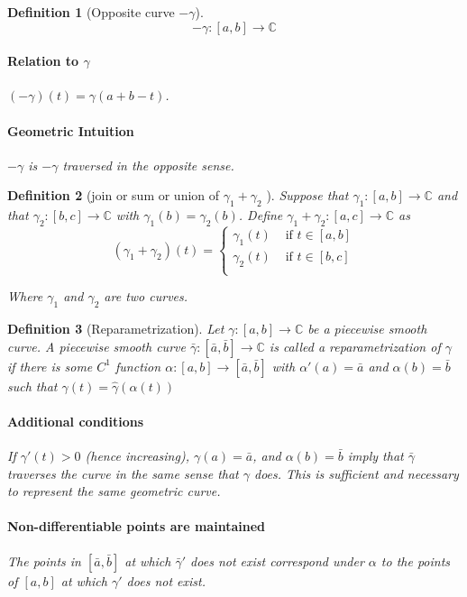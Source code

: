 \documentclass[a4paper]{article}
\newtheorem{definition}{Definition}
\newcommand{\C}{\mathbb{C}}
\begin{document}
\begin{definition}[Opposite curve $-\gamma$]
  \[
    - \gamma : [a , b] \to \C
  \]
  \paragraph{Relation to $\gamma$}
  $(- \gamma)(t) = \gamma(a + b - t)$.

  \paragraph{Geometric Intuition}
  $- \gamma $ is $- \gamma$ traversed in the opposite sense. 
\end{definition}

\begin{definition}[join or sum or union of $\gamma_1 + \gamma_2$ ]
  Suppose that $\gamma_1 : [a, b] \to \C$ and that $\gamma_2: [b, c] \to \C$ with $\gamma_1(b) = \gamma_2(b)$. 
  Define $\gamma_1 + \gamma_2 : [a, c] \to \C$ as 
  \[ (\gamma_1 + \gamma_2)(t) = \begin{cases} 
      \gamma_1(t) & \text{ if } t \in [a, b] \\ 
      \gamma_2(t) & \text{ if } t \in [b, c] \\ 
   \end{cases}
\]

  Where $\gamma_1$ and $\gamma_2$ are two curves. 
\end{definition}





\begin{definition}[Reparametrization]
  Let $\gamma : [a, b] \to \C$ be a piecewise smooth curve.
  A  piecewise smooth curve $\bar{\gamma}: [\bar{a}, \bar{b}] \to \C$ is called a reparametrization of $\gamma$ if there is some $C^1$ function $\alpha: [a, b] \to [\bar{a}, \bar{b}]$ with $\alpha'(a) = \bar{a}$ and $\alpha(b) = \bar{b}$ such that $\gamma(t) = \hat{\gamma}(\alpha(t))$
  \paragraph{Additional conditions}
  If $\gamma'(t) > 0 $ (hence increasing), $\gamma(a) = \bar{a}$, and $\alpha(b) = \bar{b}$ imply that $\bar{\gamma}$
  traverses the curve in the same sense that $\gamma$ does. This is sufficient and necessary to represent the same geometric curve.

  \paragraph{Non-differentiable points are maintained}
  The points in $[\bar{a}, \bar{b}]$ at which $\bar{\gamma}'$ does not exist correspond under $\alpha$ to the points of $[a, b]$ at which $\gamma'$ does not exist.
\end{definition}
\end{document}
